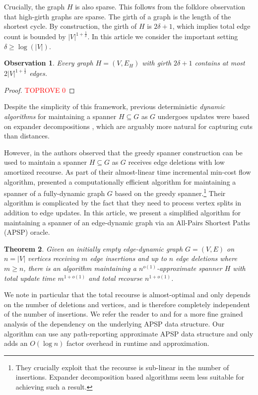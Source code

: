 \documentclass[11pt]{article}
\newtheorem{theorem}{Theorem}[section]
\newtheorem{observation}[theorem]{Observation}
\begin{document}
Crucially, the graph $H$ is also sparse. This follows from the folklore observation that high-girth graphs are sparse. 
The girth of a graph is the length of the shortest cycle. By construction, the girth of $H$ is $2\delta + 1$, which implies total edge count is bounded by $|V|^{1 + \frac{1}{\delta}}$.
In this article we consider the important setting $\delta \geq \log(|V|)$.

\begin{observation} \label{obs:girth}
    Every graph $H = (V, E_H)$ with girth $2\delta + 1$ contains at most $2|V|^{1 + \frac{1}{\delta}}$ edges.
\end{observation}
\begin{proof}\textcolor{red}{TOPROVE 0}\end{proof}

Despite the simplicity of this framework, previous deterministic \emph{dynamic algorithms} for maintaining a spanner $H \subseteq G$ as $G$ undergoes updates were based on expander decompositions \cite{maxflow, detmax}, which are arguably more natural for capturing cuts than distances. 

However, in \cite{bhattacharya_et_al:LIPIcs.ESA.2022.17} the authors observed that the greedy spanner construction can be used to maintain a spanner $H \subseteq G$ as $G$ receives edge deletions with low amortized recourse. As part of their almost-linear time incremental min-cost flow algorithm, \cite{CKL24} presented a computationally efficient algorithm for maintaining a spanner of a fully-dynamic graph $G$ based on the greedy spanner.\footnote{They crucially exploit that the recourse is sub-linear in the number of insertions. Expander decomposition based algorithms seem less suitable for achieving such a result.} Their algorithm is complicated by the fact that they need to process vertex splits in addition to edge updates. In this article, we present a simplified algorithm for maintaining a spanner of an edge-dynamic graph via an All-Pairs Shortest Paths (APSP) oracle.

\begin{theorem}  \label{thm:main}
    Given an initially empty edge-dynamic graph $G = (V, E)$ on $n = |V|$ vertices receiving $m$ edge insertions and up to $n$ edge deletions where $m \geq n$, there is an algorithm maintaining a  $n^{o(1)}$-approximate spanner $H$ with total update time $m^{1 + o(1)}$ and total recourse $n^{1 + o(1)}$. 
\end{theorem}

We note in particular that the total recourse is almost-optimal and only depends on the number of deletions and vertices, and is therefore completely independent of the number of insertions. We refer the reader to  and  for a more fine grained analysis of the dependency on the underlying APSP data structure. 
Our algorithm can use any path-reporting approximate APSP data structure and only adds an $O(\log n)$ factor overhead in runtime and approximation.
\end{document}
